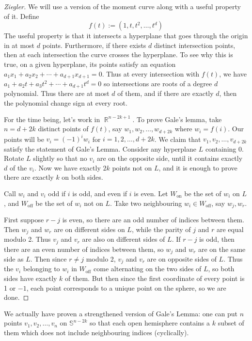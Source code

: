 \documentclass[12pt, a4paper]{book}
\DeclareMathOperator{\R}{\mathbb{R}}
\theoremstyle{nonumberplain}
\newtheorem{proof}{Proof}
\begin{document}
\begin{proof}[Ziegler]
    We will use a version of the moment curve along with a useful property of it.
    Define
    \[f(t):=(1,t,t^2,\ldots,t^d)\]
    The useful property is that it intersects a hyperplane that goes through the origin in at most $d$ points.
    Furthermore, if there exists $d$ distinct intersection points, then at each intersection the curve crosses the hyperplane.
    To see why this is true, on a given hyperplane, its points satisfy an equation $a_1x_1+a_2x_2+\cdots+a_{d+1} x_{d+1}=0$.
    Thus at every intersection with $f(t)$, we have $a_1+a_2t+a_3t^2+\cdots+a_{d+1}t^d=0$ so intersections are roots of a degree $d$ polynomial.
    Thus there are at most $d$ of them, and if there are exactly $d$, then the polynomial change sign at every root.

    For the time being, let's work in $\R^{n-2k+1}$.
    To prove Gale's lemma, take $n=d+2k$ distinct points of $f(t)$, say $w_1,w_2,\ldots,w_{d+2k}$ where $w_i=f(i)$.
    Our points will be $v_i=(-1)^i w_i$ for $i=1,2,\ldots,d+2k$.
    We claim that $v_1,v_2,\ldots,v_{d+2k}$ satisfy the statement of Gale's Lemma.
    Consider any hyperplane $L$ containing $0$.
    Rotate $L$ slightly so that no $v_i$ are on the opposite side, until it contains exactly $d$ of the $v_i$.
    Now we have exactly $2k$ points not on $L$, and it is enough to prove there are exactly $k$ on both sides.

    Call $w_i$ and $v_i$ odd if $i$ is odd, and even if $i$ is even.
    Let $W_{\text{on}}$ be the set of $w_i$ on $L$, and $W_{\text{off}}$ be the set of $w_i$ not on $L$.
    Take two neighbouring $w_i\in W_{\text{off}}$, say $w_j,w_r$.

    First suppose $r-j$ is even, so there are an odd number of indices between them.
    Then $w_j$ and $w_r$ are on different sides on $L$, while the parity of $j$ and $r$ are equal modulo 2.
    Thus $v_j$ and $v_r$ are also on different sides of $L$.
    If $r-j$ is odd, then there are an even number of indices between them, so $w_j$ and $w_r$ are on the same side as $L$.
    Then since $r\neq j$ modulo 2, $v_j$ and $v_r$ are on opposite sides of $L$.
    Thus the $v_i$ belonging to $w_i$ in $W_{\text{off}}$ come alternating on the two sides of $L$, so both sides have exactly $k$ of them.
    But then since the first coordinate of every point is 1 or $-1$, each point corresponds to a unique point on the sphere, so we are done.
\end{proof}
We actually have proven a strengthened version of Gale's Lemma: one can put $n$ points $v_1,v_2,\ldots,v_n$ on $\mathbb{S}^{n-2k}$ so that each open hemisphere contains a $k$ subset of them which does not include neighbouring indices (cyclically).
\end{document}
